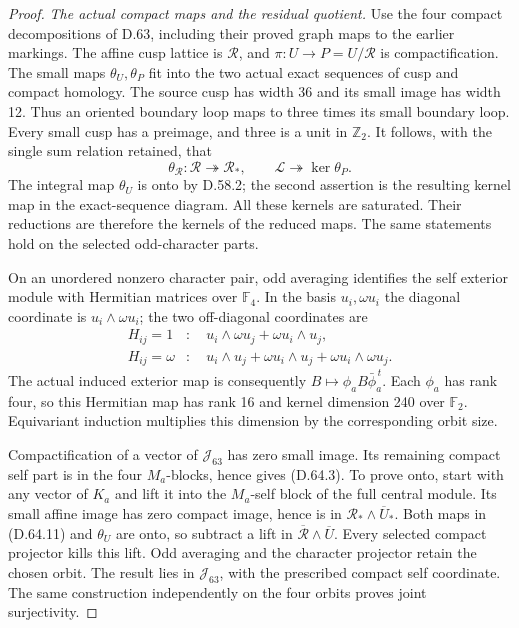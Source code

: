 \begin{proof}
\emph{The actual compact maps and the residual quotient.}
Use the four compact decompositions of D.63, including
their proved graph maps to the earlier markings.
The affine cusp lattice is \(\mathcal R\), and
\(\pi:U\to P=U/\mathcal R\) is compactification.
The small maps \(\theta_U,\theta_P\) fit into the two
actual exact sequences of cusp and compact homology.
The source cusp has width 36 and its small image has
width 12. Thus an oriented boundary loop maps to
three times its small boundary loop. Every small
cusp has a preimage, and three is a unit in
\(\mathbb Z_2\). It follows, with the single sum
relation retained, that
\[
 \theta_{\mathcal R}:\mathcal R\twoheadrightarrow\mathcal R_*,
 \qquad
 \mathcal L\twoheadrightarrow\ker\theta_P.
 \tag{D.64.11}
\]
The integral map \(\theta_U\) is onto by D.58.2;
the second assertion is the resulting kernel map
in the exact-sequence diagram. All these kernels
are saturated. Their reductions are therefore the
kernels of the reduced maps. The same statements
hold on the selected odd-character parts.

On an unordered nonzero character pair, odd averaging
identifies the self exterior module with Hermitian
matrices over \(\mathbb F_4\). In the basis
\(u_i,\omega u_i\) the diagonal coordinate is
\(u_i\wedge\omega u_i\); the two off-diagonal coordinates
are
\[
 \begin{aligned}
 H_{ij}=1&:\quad
 u_i\wedge\omega u_j+\omega u_i\wedge u_j,\\
 H_{ij}=\omega&:\quad
 u_i\wedge u_j+\omega u_i\wedge u_j
                              +\omega u_i\wedge\omega u_j.
 \end{aligned}
 \tag{D.64.12}
\]
The actual induced exterior map is consequently
\(B\mapsto\phi_aB\bar\phi_a^{\,t}\). Each
\(\phi_a\) has rank four, so this Hermitian map
has rank 16 and kernel dimension 240 over
\(\mathbb F_2\). Equivariant induction multiplies
this dimension by the corresponding orbit size.

Compactification of a vector of \(\mathcal J_{63}\)
has zero small image. Its remaining compact self
part is in the four \(M_a\)-blocks, hence gives
(D.64.3). To prove onto, start with any vector of
\(K_a\) and lift it into the \(M_a\)-self block of
the full central module. Its small affine image
has zero compact image, hence is in
\(\mathcal R_*\wedge\overline U_*\).
Both maps in (D.64.11) and \(\theta_U\) are onto,
so subtract a lift in
\(\overline{\mathcal R}\wedge\overline U\).
Every selected compact projector kills this lift.
Odd averaging and the character projector retain
the chosen orbit. The result lies in
\(\mathcal J_{63}\), with the prescribed compact
self coordinate. The same construction independently
on the four orbits proves joint surjectivity.


\end{proof}
